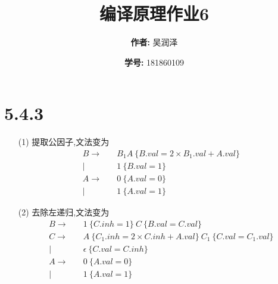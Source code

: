\documentclass[11pt]{article}
\title{编译原理作业6}
\author{
			\textbf{作者:} {吴润泽}
			\and {\textbf{学号:} 181860109}
		}
\begin{document}
\maketitle
\section*{5.4.3}
\begin{itemize}
	\item[(1)]提取公因子,文法变为
	\begin{equation}
	\begin{aligned}
		B \rightarrow\quad &B_{1} A\ \{B.val=2\times B_1.val+A.val\}\\
		  |\quad &1\ \{B.val=1\}\\
		A \rightarrow\quad &0\ \{A.val=0\}\\
		  |\quad &1\ \{A.val=1\}
	\end{aligned}
	\end{equation}
	\item[(2)]去除左递归,文法变为
	\begin{equation}
	\begin{aligned}
		B \rightarrow\quad &1\ \{C.inh=1\}\ C\ \{B.val=C.val\}\\
		C \rightarrow\quad &A\ \{C_1.inh=2\times C.inh+A.val\}\ C_1\ \{C.val=C_1.val\}\\
		|\quad &\epsilon\ \{C.val=C.inh\}\\
		A \rightarrow\quad &0\ \{A.val=0\}\\
		|\quad &1\ \{A.val=1\}
	\end{aligned}
	\end{equation}
\end{itemize}
\end{document}
